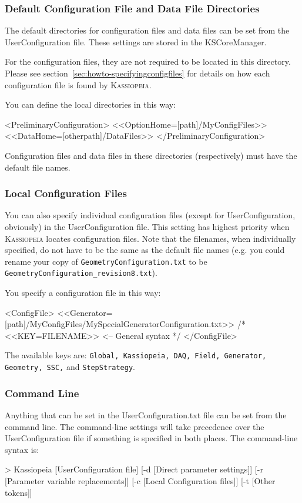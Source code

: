 \subsubsection{Default Configuration File and Data File Directories}
The default directories for configuration files and data files can be set from the UserConfiguration file.  These settings are stored in the KSCoreManager.

For the configuration files, they are not required to be located in this directory.  Please see section~\ref{sec:howto-specifyingconfigfiles} for details on how each configuration file is found by \textsc{Kassiopeia}.

You can define the local directories in this way:
\begin{DoxyCode}
<PreliminaryConfiguration>
    <<OptionHome=[path]/MyConfigFiles>>
    <<DataHome=[otherpath]/DataFiles>>
</PreliminaryConfiguration>
\end{DoxyCode}

Configuration files and data files in these directories (respectively) must have the default file names.

\subsubsection{Local Configuration Files}
You can also specify individual configuration files (except for UserConfiguration, obviously) in the UserConfiguration file. This setting has highest priority when \textsc{Kassiopeia} locates configuration files.  Note that the filenames, when individually specified, do not have to be the same as the default file names (e.g. you could rename your copy of \texttt{GeometryConfiguration.txt} to be \texttt{GeometryConfiguration\_revision8.txt}).

You specify a configuration file in this way:
\begin{DoxyCode}
<ConfigFile>
    <<Generator=[path]/MyConfigFiles/MySpecialGeneratorConfiguration.txt>>
    /* <<KEY=FILENAME>>  <-- General syntax */
</ConfigFile>
\end{DoxyCode}
The available keys are: \texttt{Global, Kassiopeia, DAQ, Field, Generator, Geometry, SSC,} and \texttt{StepStrategy}.


\subsubsection{Command Line}
Anything that can be set in the UserConfiguration.txt file can be set from the command line.  The command-line settings will take precedence over the UserConfiguration file if something is specified in both places.
The command-line syntax is:
\begin{DoxyCode}
>  Kassiopeia  [UserConfiguration file]  [-d [Direct parameter settings]] 
[-r [Parameter variable replacements]]  [-c [Local Configuration files]] 
[-t [Other tokens]]
\end{DoxyCode}

